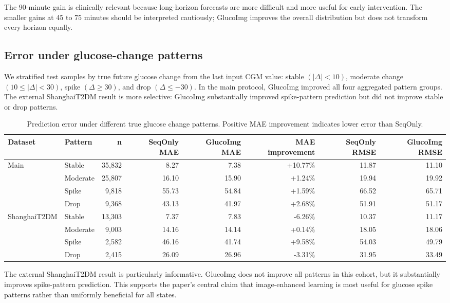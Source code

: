 \documentclass[11pt]{article}
\begin{document}
The 90-minute gain is clinically relevant because long-horizon forecasts are more difficult and more useful for early intervention. The smaller gains at 45 to 75 minutes should be interpreted cautiously; GlucoImg improves the overall distribution but does not transform every horizon equally.

\subsection{Error under glucose-change patterns}

We stratified test samples by true future glucose change from the last input CGM value: stable \((|\Delta| < 10)\), moderate change \((10 \leq |\Delta| < 30)\), spike \((\Delta \geq 30)\), and drop \((\Delta \leq -30)\). In the main protocol, GlucoImg improved all four aggregated pattern groups. The external ShanghaiT2DM result is more selective: GlucoImg substantially improved spike-pattern prediction but did not improve stable or drop patterns.

\begin{table}[t]
\centering
\caption{Prediction error under different true glucose change patterns. Positive MAE improvement indicates lower error than SeqOnly.}
\label{tab:pattern}
\small
\setlength{\tabcolsep}{4pt}
\begin{tabular}{llrrrrrr}
\toprule
Dataset & Pattern & n & SeqOnly MAE & GlucoImg MAE & MAE improvement & SeqOnly RMSE & GlucoImg RMSE \\
\midrule
\multirow{4}{*}{Main}
& Stable & 35,832 & 8.27 & 7.38 & +10.77\% & 11.87 & 11.10 \\
& Moderate & 25,807 & 16.10 & 15.90 & +1.24\% & 19.94 & 19.92 \\
& Spike & 9,818 & 55.73 & 54.84 & +1.59\% & 66.52 & 65.71 \\
& Drop & 9,368 & 43.13 & 41.97 & +2.68\% & 51.91 & 51.17 \\
\midrule
\multirow{4}{*}{ShanghaiT2DM}
& Stable & 13,303 & 7.37 & 7.83 & -6.26\% & 10.37 & 11.17 \\
& Moderate & 9,003 & 14.16 & 14.14 & +0.14\% & 18.05 & 18.06 \\
& Spike & 2,582 & 46.16 & 41.74 & +9.58\% & 54.03 & 49.79 \\
& Drop & 2,415 & 26.09 & 26.96 & -3.31\% & 31.95 & 33.49 \\
\bottomrule
\end{tabular}
\end{table}

The external ShanghaiT2DM result is particularly informative. GlucoImg does not improve all patterns in this cohort, but it substantially improves spike-pattern prediction. This supports the paper's central claim that image-enhanced learning is most useful for glucose spike patterns rather than uniformly beneficial for all states.
\end{document}
